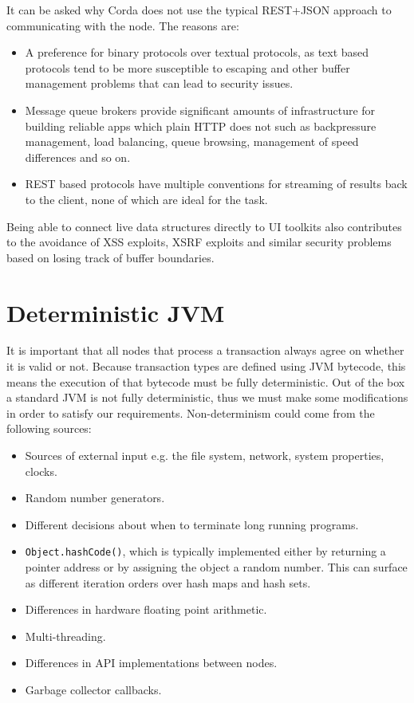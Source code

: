 \documentclass{article}
\begin{document}
It can be asked why Corda does not use the typical REST+JSON approach to communicating with the node. The reasons
are:

\begin{itemize}
\item A preference for binary protocols over textual protocols, as text based protocols tend to be more
susceptible to escaping and other buffer management problems that can lead to security issues.
\item Message queue brokers provide significant amounts of infrastructure for building reliable apps
which plain HTTP does not such as backpressure management, load balancing, queue browsing, management of speed
differences and so on.
\item REST based protocols have multiple conventions for streaming of results back to the client, none of which
are ideal for the task.
\end{itemize}

Being able to connect live data structures directly to UI toolkits also contributes to the avoidance of XSS
exploits, XSRF exploits and similar security problems based on losing track of buffer boundaries.

\section{Deterministic JVM}\label{sec:djvm}

It is important that all nodes that process a transaction always agree on whether it is valid or not. Because
transaction types are defined using JVM bytecode, this means the execution of that bytecode must be fully
deterministic. Out of the box a standard JVM is not fully deterministic, thus we must make some modifications in
order to satisfy our requirements. Non-determinism could come from the following sources:

\begin{itemize}
    \item Sources of external input e.g. the file system, network, system properties, clocks.
    \item Random number generators.
    \item Different decisions about when to terminate long running programs.
    \item \texttt{Object.hashCode()}, which is typically implemented either by returning a pointer address or by
    assigning the object a random number. This can surface as different iteration orders over hash maps and hash sets.
    \item Differences in hardware floating point arithmetic.
    \item Multi-threading.
    \item Differences in API implementations between nodes.
    \item Garbage collector callbacks.
\end{itemize}
\end{document}
